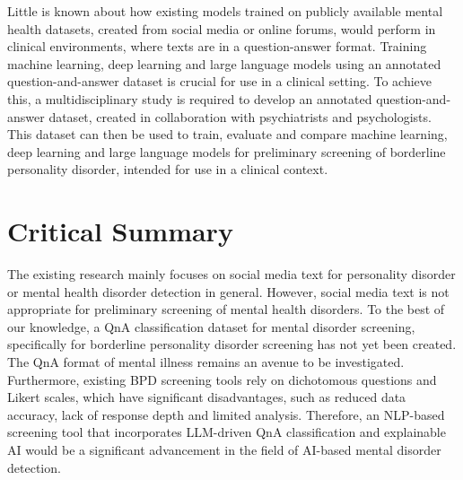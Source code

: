 Little is known about how existing models trained on publicly available mental health datasets, created from social media or online forums, would perform in clinical environments, where texts are in a question-answer format. Training machine learning, deep learning and large language models using an annotated question-and-answer dataset is crucial for use in a clinical setting. To achieve this, a multidisciplinary study is required to develop an annotated question-and-answer dataset, created in collaboration with psychiatrists and psychologists. This dataset can then be used to train, evaluate and compare machine learning, deep learning and large language models for preliminary screening of borderline personality disorder, intended for use in a clinical context.



\section{Critical Summary}
 The existing research mainly focuses on social media text for personality disorder or mental health disorder detection in general. However, social media text is not appropriate for preliminary screening of mental health disorders. To the best of our knowledge, a QnA classification dataset for mental disorder screening, specifically for borderline personality disorder screening has not yet been created. The QnA format of mental illness remains an avenue to be investigated. Furthermore, existing BPD screening tools rely on dichotomous questions and Likert scales, which have significant disadvantages, such as reduced data accuracy, lack of response depth and limited analysis. Therefore, an NLP-based screening tool that incorporates LLM-driven QnA classification and explainable AI would be a significant advancement in the field of AI-based mental disorder detection.


\endinput

